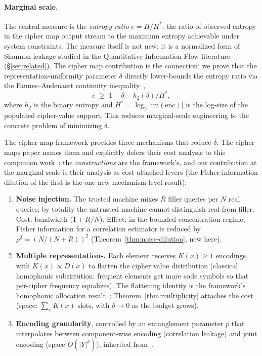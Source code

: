 \documentclass[11pt]{article}
\theoremstyle{definition}
\theoremstyle{plain}
\theoremstyle{remark}
\newcommand{\enc}{\mathrm{enc}}
\begin{document}
\paragraph{Marginal scale.}
The central measure is the \emph{entropy ratio} $e = H/H^*$: the ratio
of observed entropy in the cipher map output stream to the maximum
entropy achievable under system constraints.  The measure itself is
not new; it is a normalized form of Shannon leakage studied in the
Quantitative Information Flow literature
(\S\ref{sec:related}).  The cipher map contribution is the connection:
we prove that the representation-uniformity parameter $\delta$
directly lower-bounds the entropy ratio via the Fannes--Audenaert
continuity inequality~\cite{fannes1973continuity,audenaert2007sharp},
\[
e \;\geq\; 1 - \delta - h_2(\delta)/H^*,
\]
where $h_2$ is the binary entropy and $H^* = \log_2|\mathrm{im}(\enc)|$
is the log-size of the populated cipher-value support.  This reduces
marginal-scale
engineering to the concrete problem of minimizing $\delta$.

The cipher map framework provides three mechanisms that reduce
$\delta$.  The cipher maps paper names them and explicitly defers
their cost analysis to this companion
work~\cite[Rem.~5.1]{towell2026cipher}; the \emph{constructions} are
the framework's, and our contribution at the marginal scale is their
analysis as cost-attached levers (the Fisher-information dilution of
the first is the one new mechanism-level result):

\begin{enumerate}
\item \textbf{Noise injection.}  The trusted machine mixes $R$ filler
  queries per $N$ real queries; by totality the untrusted machine
  cannot distinguish real from filler.  Cost: bandwidth ($1 + R/N$).
  Effect: in the bounded-concentration regime, Fisher information for a
  correlation estimator is reduced by $\rho^2 = (N/(N+R))^2$
  (Theorem~\ref{thm:noise-dilution}, new here).

\item \textbf{Multiple representations.}  Each element receives
  $K(x) \geq 1$ encodings, with $K(x) \propto D(x)$ to flatten the
  cipher value distribution (classical homophonic substitution:
  frequent elements get more code symbols so that per-cipher frequency
  equalizes).  The flattening identity is the framework's homophonic
  allocation result~\cite[Prop.~4.1]{towell2026cipher};
  Theorem~\ref{thm:multiplicity} attaches the cost (space:
  $\sum_x K(x)$ slots, with $\delta \to 0$ as the budget grows).

\item \textbf{Encoding granularity}, controlled by an entanglement
  parameter $p$ that interpolates between component-wise encoding
  (correlation leakage) and joint encoding (space $O(|Y|^k)$),
  inherited from~\cite[Sec.~8]{towell2026cipher}.
\end{enumerate}
\end{document}
